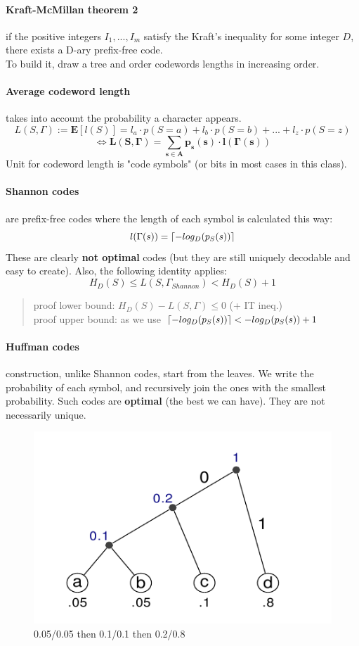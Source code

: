 \documentclass{article}
\DeclarePairedDelimiter\ceil{\lceil}{\rceil}
\begin{document}
\paragraph{Kraft-McMillan theorem 2} if the positive integers $ I_1, ..., I_m $ satisfy the Kraft's inequality for some integer $ D $, there exists a D-ary prefix-free code.\\
To build it, draw a tree and order codewords lengths in increasing order.

\paragraph{Average codeword length} takes into account the probability a character appears.
\[ L(S, \Gamma) := \mathbf{E}[l(S)] = l_a \cdot p(S = a) +l_b \cdot p(S = b) + ... + l_z \cdot p(S = z) \]
\[ \mathbf{\Leftrightarrow L(S, \Gamma) = \sum_{s \in A} p_s(s) \cdot l(\Gamma(s))} \]
Unit for codeword length is "code symbols" (or bits in most cases in this class).

\paragraph{Shannon codes} are prefix-free codes where the length of each symbol is calculated this way:
\[ l(\Gamma(s)) = \ceil*{-log_D(p_S(s))} \]
These are clearly \textbf{not optimal} codes (but they are still uniquely decodable and easy to create). Also, the following identity applies:
\[ H_D(S) \leq L(S, \Gamma_{Shannon}) < H_D(S) + 1 \]
\begin{quote}
proof lower bound: $ H_D(S) - L(S, \Gamma) \leq 0 $ (+ IT ineq.)\\
proof upper bound: as we use $ \ceil*{-log_D(p_S(s))} < -log_D(p_S(s)) + 1$
\end{quote}

\paragraph{Huffman codes} construction, unlike Shannon codes, start from the leaves. We write the probability of each symbol, and recursively join the ones with the smallest probability. Such codes are \textbf{optimal} (the best we can have). They are not necessarily unique.

\begin{figure}[h]
    \centering
    \includegraphics[width=0.5\linewidth]{huffman.png}
    \caption{0.05/0.05 then 0.1/0.1 then 0.2/0.8}
    \label{fig:enter-label}
\end{figure}
\end{document}
